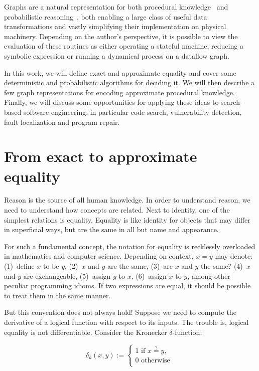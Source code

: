 \documentclass[11pt]{article}
\begin{document}
    Graphs are a natural representation for both procedural knowledge~\citep{allamanis2017learning} and probabilistic reasoning~\citep{pearl2014probabilistic}, both enabling a large class of useful data transformations and vastly simplifying their implementation on physical machinery. Depending on the author's perspective, it is possible to view the evaluation of these routines as either operating a stateful machine, reducing a symbolic expression or running a dynamical process on a dataflow graph.

    In this work, we will define exact and approximate equality and cover some deterministic and probabilistic algorithms for deciding it. We will then describe a few graph representations for encoding approximate procedural knowledge. Finally, we will discuss some opportunities for applying these ideas to search-based software engineering, in particular code search, vulnerability detection, fault localization and program repair.


    \section{From exact to approximate equality}\label{sec:definitions}

    Reason is the source of all human knowledge. In order to understand reason, we need to understand how concepts are related. Next to identity, one of the simplest relations is equality. Equality is like identity for objects that may differ in superficial ways, but are the same in all but name and appearance.

    For such a fundamental concept, the notation for equality is recklessly overloaded in mathematics and computer science. Depending on context, $x = y$ may denote: (1)~define $x$ to be $y$, (2)~$x$ and $y$ are the same, (3)~are $x$ and $y$ the same? (4)~$x$ and $y$ are exchangeable, (5)~assign $y$ to $x$, (6)~assign $x$ to $y$, among other peculiar programming idioms. If two expressions are equal, it should be possible to treat them in the same manner.

    But this convention does not always hold! Suppose we need to compute the derivative of a logical function with respect to its inputs. The trouble is, logical equality is not differentiable. Consider the Kronecker $δ$-function: %

    $$
    δ_k(x, y) :=
    \begin{cases}
        1 \text{ if } x \overset{?}{=} y, \\
        0 \text{ otherwise }\\
    \end{cases}
    $$
\end{document}
